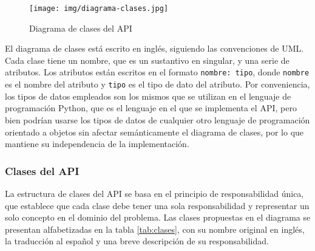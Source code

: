 \begin{figure}[h]
	\centering
	\texttt{[image: img/diagrama-clases.jpg]}
	\caption{Diagrama de clases del API}
	\label{fig:diagrama_clases}
\end{figure}

El diagrama de clases está escrito en inglés, siguiendo las convenciones de UML. Cada clase tiene un nombre, que es un sustantivo en singular, y una serie de atributos. Los atributos están escritos en el formato \texttt{nombre: tipo}, donde \texttt{nombre} es el nombre del atributo y \texttt{tipo} es el tipo de dato del atributo. Por conveniencia, los tipos de datos empleados son los mismos que se utilizan en el lenguaje de programación Python, que es el lenguaje en el que se implementa el API, pero bien podrían usarse los tipos de datos de cualquier otro lenguaje de programación orientado a objetos sin afectar semánticamente el diagrama de clases, por lo que mantiene su independencia de la implementación.

\subsubsection{Clases del API}

La estructura de clases del API se basa en el principio de responsabilidad única, que establece que cada clase debe tener una sola responsabilidad y representar un solo concepto en el dominio del problema. Las clases propuestas en el diagrama se presentan alfabetizadas en la tabla \ref{tab:clases}, con su nombre original en inglés, la traducción al español y una breve descripción de su responsabilidad.

